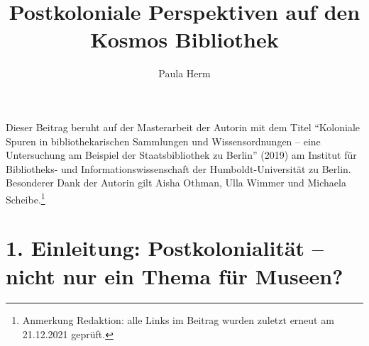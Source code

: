 \documentclass[a4paper,
fontsize=11pt,
oneside,
numbers=noperiodatend,
parskip=half-,
bibliography=totoc,
final
]{scrartcl}
\title{\LARGE{Postkoloniale Perspektiven auf den Kosmos Bibliothek}}%
\author{Paula Herm} %
\date{}
\begin{document}
\maketitle
\thispagestyle{fancyplain} 


Dieser Beitrag beruht auf der Masterarbeit der Autorin mit dem Titel
\enquote{Koloniale Spuren in bibliothekarischen Sammlungen und
Wissensordnungen -- eine Untersuchung am Beispiel der Staatsbibliothek
zu Berlin} (2019) am Institut für Bibliotheks- und
Informationswissenschaft der Humboldt-Universität zu Berlin. Besonderer
Dank der Autorin gilt Aisha Othman, Ulla Wimmer und Michaela
Scheibe.\footnote{Anmerkung Redaktion: alle Links im Beitrag wurden
  zuletzt erneut am 21.12.2021 geprüft.}

\hypertarget{einleitung-postkolonialituxe4t-nicht-nur-ein-thema-fuxfcr-museen}{%
\section{1. Einleitung: Postkolonialität -- nicht nur ein Thema
für
Museen?}\label{einleitung-postkolonialituxe4t-nicht-nur-ein-thema-fuxfcr-museen}}
\end{document}
